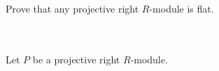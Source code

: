 Prove that any projective right $R$-module is flat.\\\\

\begin{solution}\renewcommand{\qedsymbol}{}\ \\
    Let $P$ be a projective right $R$-module.
\end{solution}